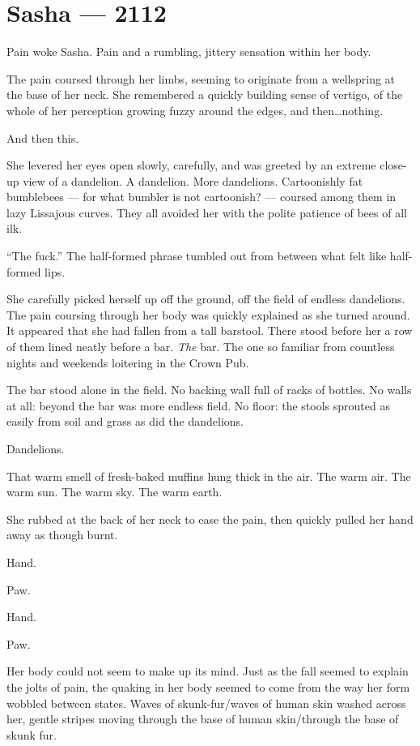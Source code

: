 \hypertarget{sasha-2112}{%
\chapter*{Sasha — 2112}\label{sasha-2112}}

Pain woke Sasha. Pain and a rumbling, jittery sensation within her body.

The pain coursed through her limbs, seeming to originate from a wellspring at the base of her neck. She remembered a quickly building sense of vertigo, of the whole of her perception growing fuzzy around the edges, and then\ldots{}nothing.

And then this.

She levered her eyes open slowly, carefully, and was greeted by an extreme close-up view of a dandelion. A dandelion. More dandelions. Cartoonishly fat bumblebees — for what bumbler is not cartoonish? — coursed among them in lazy Lissajous curves. They all avoided her with the polite patience of bees of all ilk.

``The fuck.'' The half-formed phrase tumbled out from between what felt like half-formed lips.

She carefully picked herself up off the ground, off the field of endless dandelions. The pain coursing through her body was quickly explained as she turned around. It appeared that she had fallen from a tall barstool. There stood before her a row of them lined neatly before a bar. \emph{The} bar. The one so familiar from countless nights and weekends loitering in the Crown Pub.

The bar stood alone in the field. No backing wall full of racks of bottles. No walls at all: beyond the bar was more endless field. No floor: the stools sprouted as easily from soil and grass as did the dandelions.

Dandelions.

That warm smell of fresh-baked muffins hung thick in the air. The warm air. The warm sun. The warm sky. The warm earth.


She rubbed at the back of her neck to ease the pain, then quickly pulled her hand away as though burnt.

Hand.

Paw.

Hand.

Paw.

Her body could not seem to make up its mind. Just as the fall seemed to explain the jolts of pain, the quaking in her body seemed to come from the way her form wobbled between states. Waves of skunk-fur/waves of human skin washed across her, gentle stripes moving through the base of human skin/through the base of skunk fur.

